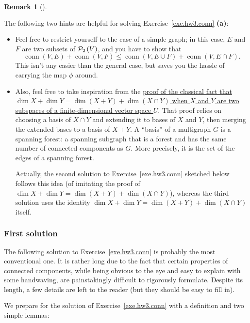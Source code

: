 \documentclass[numbers=enddot,12pt,final,onecolumn,notitlepage]{scrartcl}%
\theoremstyle{definition}
\newtheorem{remk}[theo]{Remark}
\newenvironment{remark}[1][]
{\begin{remk}[#1]\begin{leftbar}}
{\end{leftbar}\end{remk}}
\newcommand{\conn}{\operatorname{conn}}
\newcommand{\powset}[2][]{\ifthenelse{\equal{#2}{}}{\mathcal{P}\left(#1\right)}{\mathcal{P}_{#1}\left(#2\right)}}
\newcommand{\tup}[1]{\left( #1 \right)}
\begin{document}
\begin{remark}
The following two hints are helpful for
solving Exercise~\ref{exe.hw3.conn} \textbf{(a)}:

\begin{itemize}
\item
Feel free to restrict yourself to the case of a simple graph; in this
case, $E$ and $F$ are two subsets of $\powset[2]{V}$, and you have to
show that
\[
\conn \tup{V, E} + \conn \tup{V, F}
\leq \conn \tup{V, E \cup F}
+ \conn \tup{V, E \cap F} .
\]
This isn't any easier than the general case, but saves you the hassle
of carrying the map $\phi$ around.

\item
Also, feel free to take inspiration from the
\href{http://math.stackexchange.com/questions/500511/dimension-of-the-sum-of-two-vector-subspaces}{proof
of the classical fact that
$\dim X + \dim Y = \dim \tup{X + Y} + \dim \tup{X \cap Y}$ when $X$
and $Y$ are two subspaces of a finite-dimensional vector space $U$}.
That proof relies on choosing a basis of $X \cap Y$ and extending it
to bases of $X$ and $Y$, then merging the extended bases to a basis of
$X + Y$. A ``basis'' of a multigraph $G$ is a spanning forest: a
spanning subgraph that is a forest and has the same number of
connected components as $G$. More precisely, it is the set of the
edges of a spanning forest.

Actually, the second solution to Exercise~\ref{exe.hw3.conn}
sketched below follows this idea (of imitating the proof of
$\dim X + \dim Y = \dim \tup{X + Y} + \dim \tup{X \cap Y}$),
whereas the third solution uses the identity
$\dim X + \dim Y = \dim \tup{X + Y} + \dim \tup{X \cap Y}$
itself.
\end{itemize}
\end{remark}

\subsubsection{First solution}
The following solution to Exercise~\ref{exe.hw3.conn} is probably
the most conventional one.
It is rather long due to the fact that certain properties of
connected components, while being obvious to the eye and easy to
explain with some handwaving, are painstakingly difficult to
rigorously formulate.
Despite its length, a few details are left to the reader (but they
should be easy to fill in).

We prepare for the solution of Exercise~\ref{exe.hw3.conn} with a
definition and two simple lemmas:
\end{document}
